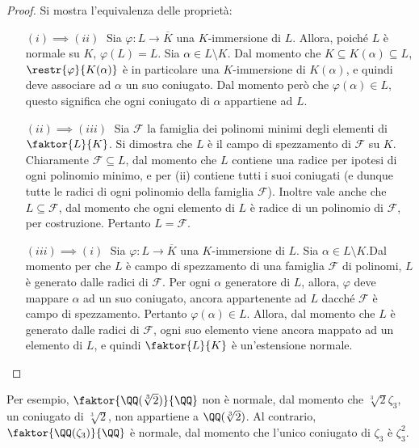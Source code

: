 \documentclass[12pt]{scrartcl}
\begin{document}
	\begin{proof}
		Si mostra l'equivalenza delle proprietà:

		\begin{itemize}
			\item[$(i)\implies (ii)\;$] Sia $\varphi : L
			\to \overline{K}$ una $K$-immersione di $L$. Allora,
			poiché $L$ è normale su $K$, $\varphi(L) = L$.
			Sia $\alpha \in L \setminus K$.
			Dal momento che $K \subseteq K(\alpha) \subseteq L$,
			$\restr{\varphi}{K(\alpha)}$ è in particolare
			una $K$-immersione di $K(\alpha)$, e quindi
			deve associare ad $\alpha$ un suo coniugato.
			Dal momento però che $\varphi(\alpha) \in L$,
			questo significa che ogni coniugato di $\alpha$
			appartiene ad $L$.
			
			\item[$(ii)\implies (iii)\;$] Sia $\mathcal{F}$
			la famiglia dei polinomi minimi degli elementi
			di $\faktor{L}{K}$. Si dimostra che
			$L$ è il campo di spezzamento di $\mathcal{F}$ su
			$K$. Chiaramente $\mathcal{F} \subseteq L$,
			dal momento che $L$ contiene una radice per
			ipotesi di ogni polinomio minimo, e per
			(ii) contiene tutti i suoi coniugati (e dunque
			tutte le radici di ogni polinomio della famiglia
			$\mathcal{F}$). Inoltre vale anche
			che $L \subseteq \mathcal{F}$, dal momento che
			ogni elemento di $L$ è radice di un polinomio
			di $\mathcal{F}$, per costruzione. Pertanto
			$L = \mathcal{F}$.
			
			\item[$(iii)\implies (i)\;$] Sia $\varphi : L
			\to \overline{K}$ una $K$-immersione di $L$. Sia
			$\alpha \in L \setminus K$.Dal momento per che $L$
			è campo di spezzamento di una famiglia $\mathcal{F}$ di polinomi,
			$L$ è generato dalle radici di $\mathcal{F}$.
			Per ogni $\alpha$ generatore di $L$, allora,
			$\varphi$ deve mappare $\alpha$ ad un suo
			coniugato, ancora appartenente ad $L$ dacché
			$\mathcal{F}$ è campo di spezzamento. Pertanto
			$\varphi(\alpha) \in L$. Allora, dal momento
			che $L$ è generato dalle radici di $\mathcal{F}$,
			ogni suo elemento viene ancora mappato ad un
			elemento di $L$, e quindi $\faktor{L}{K}$ è
			un'estensione normale.
		\end{itemize}
	\end{proof}

	\begin{remark}
		Per esempio, $\faktor{\QQ(\sqrt[3]{2})}{\QQ}$ non
		è normale, dal momento che $\sqrt[3]{2} \zeta_3$,
		un coniugato di $\sqrt[3]{2}$, non appartiene
		a $\QQ(\sqrt[3]{2})$. Al contrario,
		$\faktor{\QQ(\zeta_3)}{\QQ}$ è normale, dal
		momento che l'unico coniugato di $\zeta_3$ è
		$\zeta_3^2$. 
	\end{remark}
\end{document}

